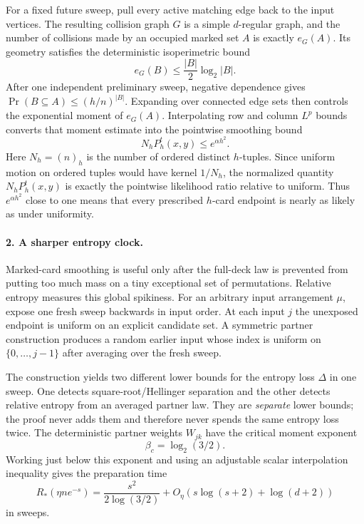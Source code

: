\documentclass[11pt]{article}
\numberwithin{equation}{section}
\theoremstyle{definition}\newtheorem{definition}[theorem]{Definition}
\theoremstyle{remark}\newtheorem{remark}[theorem]{Remark}
\begin{document}
For a fixed future sweep, pull every active matching edge back to the input
vertices.  The resulting collision graph $G$ is a simple $d$-regular graph,
and the number of collisions made by an occupied marked set $A$ is exactly
$e_G(A)$.  Its geometry satisfies the deterministic isoperimetric bound
\[
 e_G(B)\le \frac{|B|}{2}\log_2|B|.
\]
After one independent preliminary sweep, negative dependence gives
$\Pr(B\subseteq A)\le(h/n)^{|B|}$.  Expanding over connected edge sets then
controls the exponential moment of $e_G(A)$.  Interpolating row and column
$L^p$ bounds converts that moment estimate into the pointwise smoothing bound
\[
 N_hP_h^t(x,y)\le e^{\alpha h^2}.
\]
Here $N_h=(n)_h$ is the number of ordered distinct $h$-tuples.  Since uniform
motion on ordered tuples would have kernel $1/N_h$, the normalized quantity
$N_hP_h^t(x,y)$ is exactly the pointwise likelihood ratio relative to uniform.
Thus $e^{\alpha h^2}$ close to one means that every prescribed $h$-card
endpoint is nearly as likely as under uniformity.

\paragraph{2. A sharper entropy clock.}
Marked-card smoothing is useful only after the full-deck law is prevented from
putting too much mass on a tiny exceptional set of permutations.  Relative
entropy measures this global spikiness.  For an arbitrary input arrangement
$\mu$, expose one fresh sweep backwards in input order.  At each input $j$ the
unexposed endpoint is uniform on an explicit candidate set.  A symmetric
partner construction produces a random earlier input whose index is uniform
on $\{0,\ldots,j-1\}$ after averaging over the fresh sweep.

The construction yields two different lower bounds for the entropy loss
$\Delta$ in one sweep.  One detects square-root/Hellinger separation and the
other detects relative entropy from an averaged partner law.  They are
\emph{separate} lower bounds; the proof never adds them and therefore never
spends the same entropy loss twice.  The deterministic partner weights
$W_{jk}$ have the critical moment exponent
\[
 \beta_c=\log_2(3/2).
\]
Working just below this exponent and using an adjustable scalar interpolation
inequality gives the preparation time
\[
 R_*(\eta ne^{-s})=
 \frac{s^2}{2\log(3/2)}
 +O_\eta(s\log(s+2)+\log(d+2))
\]
in sweeps.
\end{document}
